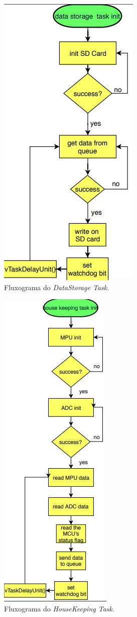 \begin{apendicesenv}
\begin{figure}[!h]
	\centerfloat
	\centering
	\includegraphics[keepaspectratio=true,scale=0.5]{figuras/flowChart_dataStorage.PNG}
	\caption{Fluxograma do \textit{DataStorage Task}.}
	\label{flowChart_dataStorage}
\end{figure}

\begin{figure}[!h]
	\centerfloat
	\centering
	\includegraphics[keepaspectratio=true,scale=0.45]{figuras/flowChart_houseKeeping.PNG}
	\caption{Fluxograma do \textit{HouseKeeping Task}.}
	\label{flowChart_houseKeeping}
\end{figure}


\end{apendicesenv}